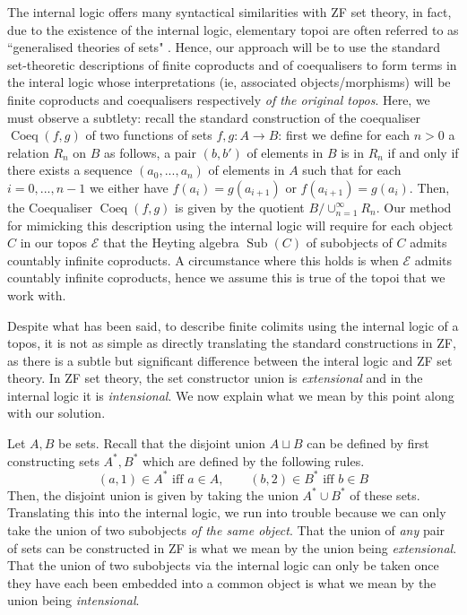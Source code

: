 \documentclass{birkjour}
\theoremstyle{plain}
\theoremstyle{definition}
\newcommand{\call}[1]{\mathcal{#1}}
\newcommand{\lto}{\longrightarrow}
\begin{document}
	The internal logic offers many syntactical similarities with ZF set theory, in fact, due to the existence of the internal logic, elementary topoi are often referred to as ``generalised theories of sets" \cite[\S Prologue, page 1]{MM}. Hence, our approach will be to use the standard set-theoretic descriptions of finite coproducts and of coequalisers to form terms in the interal logic whose interpretations (ie, associated objects/morphisms) will be finite coproducts and coequalisers respectively \emph{of the original topos}. Here, we must observe a subtlety: recall the standard construction of the coequaliser $\operatorname{Coeq}(f,g)$ of two functions of sets $f,g:A \lto B$: first we define for each $n > 0$ a relation $R_n$ on $B$ as follows, a pair $(b,b')$ of elements in $B$ is in $R_n$ if and only if there exists a sequence $(a_0,...,a_n)$ of elements in $A$ such that for each $i = 0,...,n-1$ we either have $f(a_i) = g(a_{i+1})$ or $f(a_{i+1}) = g(a_i)$. Then, the Coequaliser $\operatorname{Coeq}(f,g)$ is given by the quotient $B/\cup_{n = 1}^\infty R_n$. Our method for mimicking this description using the internal logic will require for each object $C$ in our topos $\call{E}$ that the Heyting algebra $\operatorname{Sub}(C)$ of subobjects of $C$ admits countably infinite coproducts. A circumstance where this holds is when $\call{E}$ admits countably infinite coproducts, hence we assume this is true of the topoi that we work with.
	
	Despite what has been said, to describe finite colimits using the internal logic of a topos, it is not as simple as directly translating the standard constructions in ZF, as there is a subtle but significant difference between the interal logic and ZF set theory. In ZF set theory, the set constructor union is \emph{extensional} and in the internal logic it is \emph{intensional}. We now explain what we mean by this point along with our solution.
	
	Let $A,B$ be sets. Recall that the disjoint union $A \sqcup B$ can be defined by first constructing sets $A^\ast,B^\ast$ which are defined by the following rules.
	\begin{equation}
		(a,1) \in A^\ast \text{ iff }a \in A,\qquad (b,2) \in B^\ast \text{ iff } b \in B
	\end{equation}
	Then, the disjoint union is given by taking the union $A^\ast \cup B^\ast$ of these sets. Translating this into the internal logic, we run into trouble because we can only take the union of two subobjects \emph{of the same object}. That the union of \emph{any} pair of sets can be constructed in ZF is what we mean by the union being \emph{extensional}. That the union of two subobjects via the internal logic can only be taken once they have each been embedded into a common object is what we mean by the union being \emph{intensional}.
	
\end{document}
